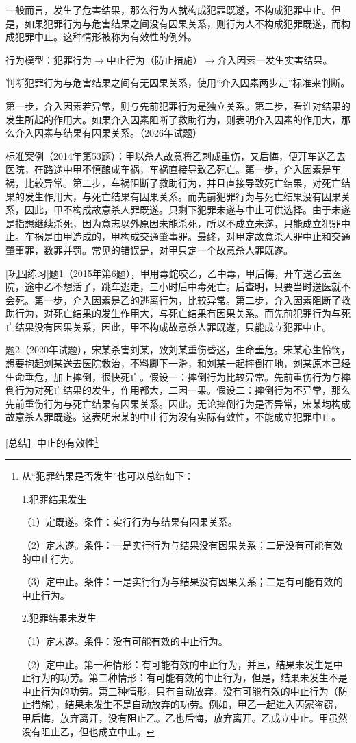 一般而言，发生了危害结果，那么行为人就构成犯罪既遂，不构成犯罪中止。但是，如果犯罪行为与危害结果之间没有因果关系，则行为人不构成犯罪既遂，而构成犯罪中止。这种情形被称为有效性的例外。

行为模型：犯罪行为\ensuremath{\rightarrow}中止行为（防止措施）\ensuremath{\rightarrow}介入因素一发生实害结果。

判断犯罪行为与危害结果之间有无因果关系，使用“介入因素两步走”标准来判断。

第一步，介入因素若异常，则与先前犯罪行为是独立关系。第二步，看谁对结果的发生所起的作用大。如果介入因素阻断了救助行为，则表明介入因素的作用大，那么介入因素与结果有因果关系。（2026年试题）

标准案例（2014年第53题）：甲以杀人故意将乙刺成重伤，又后悔，便开车送乙去医院，在路途中甲不慎酿成车祸，车祸直接导致乙死亡。第一步，介入因素是车祸，比较异常。第二步，车祸阻断了救助行为，并且直接导致死亡结果，对死亡结果的发生作用大，与死亡结果有因果关系。而先前犯罪行为与死亡结果没有因果关系，因此，甲不构成故意杀人罪既遂。只剩下犯罪未遂与中止可供选择。由于未遂是指想继续杀死，因为意志以外原因未能杀死，所以不成立未遂，只能成立犯罪中止。车祸是由甲造成的，甲构成交通肇事罪。最终，对甲定故意杀人罪中止和交通肇事罪，数罪并罚。常见的错误是，对甲只定一个故意杀人罪既遂。

[巩固练习]题1（2015年第6题），甲用毒蛇咬乙，乙中毒，甲后悔，开车送乙去医院，途中乙不想活了，跳车逃走，三小时后中毒死亡。后查明，只要当时送医就不会死。第一步，介入因素是乙的逃离行为，比较异常。第二步，介入因素阻断了救助行为，对死亡结果的发生作用大，与死亡结果有因果关系。而先前犯罪行为与死亡结果没有因果关系，因此，甲不构成故意杀人罪既遂，只能成立犯罪中止。

题2（2020年试题），宋某杀害刘某，致刘某重伤昏迷，生命垂危。宋某心生怜悯，想要抱起刘某送去医院救治，不料脚下一滑，和刘某一起摔倒在地，刘某原本已经生命垂危，加上摔倒，很快死亡。假设一：摔倒行为比较异常。先前重伤行为与摔倒行为对死亡结果的发生，作用都大，二因一果。假设二：摔倒行为不异常，那么先前重伤行为与死亡结果有因果关系。因此，无论摔倒行为是否异常，宋某均构成故意杀人罪既遂。这表明宋某的中止行为没有实际有效性，不能成立犯罪中止。

[总结］中止的有效性\footnote{从“犯罪结果是否发生”也可以总结如下：

1.犯罪结果发生

（1）定既遂。条件：实行行为与结果有因果关系。

（2）定未遂。条件：一是实行行为与结果没有因果关系；二是没有可能有效的中止行为。

（3）定中止。条件：一是实行行为与结果没有因果关系；二是有可能有效的中止行为。

2.犯罪结果未发生

（1）定未遂。条件：没有可能有效的中止行为。

（2）定中止。第一种情形：有可能有效的中止行为，并且，结果未发生是中止行为的功劳。第二种情形：有可能有效的中止行为，但是，结果未发生不是中止行为的功劳。第三种情形，只有自动放弃，没有可能有效的中止行为（防止措施），结果未发生不是自动放弃的功劳。例如，甲乙一起进入丙家盗窃，甲后悔，放弃离开，没有阻止乙。乙也后悔，放弃离开。乙成立中止。甲虽然没有阻止乙，但也成立中止。}


